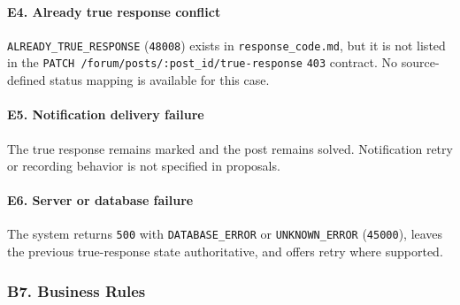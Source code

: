 \documentclass[12pt]{article}
\begin{document}
\hypertarget{sec:e4-already-true-response-conflict}{}
\paragraph*{E4. Already true response conflict}
\par\medskip

\texttt{ALREADY\_TRUE\_RESPONSE} (\texttt{48008}) exists in \texttt{response\_code.md}, but it is not listed in the \texttt{PATCH /forum/posts/:post\_id/true-response} \texttt{403} contract. No source-defined status mapping is available for this case.
\par\medskip

\hypertarget{sec:e5-notification-delivery-failure}{}
\paragraph*{E5. Notification delivery failure}
\par\medskip

The true response remains marked and the post remains solved. Notification retry or recording behavior is not specified in proposals.
\par\medskip

\hypertarget{sec:e6-server-or-database-failure}{}
\paragraph*{E6. Server or database failure}
\par\medskip

The system returns \texttt{500} with \texttt{DATABASE\_ERROR} or \texttt{UNKNOWN\_ERROR} (\texttt{45000}), leaves the previous true-response state authoritative, and offers retry where supported.
\par\medskip

\hypertarget{sec:b7-business-rules}{}
\subsubsection*{B7. Business Rules}
\par\medskip
\end{document}
